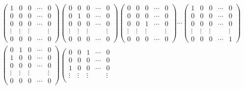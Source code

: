 \documentclass[11pt]{amsart}
\theoremstyle{definition}  %
\begin{document}
\begin{align*}
	&\left ( \begin{array}{ccccc}
		1 & 0 & 0 & \cdots & 0\\
		0 & 0 & 0 & \cdots & 0\\
		0 & 0 & 0 & \cdots & 0\\
		\vdots & \vdots & \vdots && \vdots \\
		0 & 0 & 0 & \cdots & 0
	\end{array} \right )
	\left ( \begin{array}{ccccc}
		0 & 0 & 0 & \cdots & 0\\
		0 & 1 & 0 & \cdots & 0\\
		0 & 0 & 0 & \cdots & 0\\
		\vdots & \vdots & \vdots && \vdots \\
		0 & 0 & 0 & \cdots & 0
	\end{array} \right )	
	\left ( \begin{array}{ccccc}
		0 & 0 & 0 & \cdots & 0\\
		0 & 0 & 0 & \cdots & 0\\
		0 & 0 & 1 & \cdots & 0\\
		\vdots & \vdots & \vdots && \vdots \\
		0 & 0 & 0 & \cdots & 0
	\end{array} \right )\cdots
	\left ( \begin{array}{ccccc}
		1 & 0 & 0 & \cdots & 0\\
		0 & 0 & 0 & \cdots & 0\\
		0 & 0 & 0 & \cdots & 0\\
		\vdots & \vdots & \vdots && \vdots \\
		0 & 0 & 0 & \cdots & 1
	\end{array} \right )\\
	&\left ( \begin{array}{ccccc}
		0 & 1 & 0 & \cdots & 0\\
		1 & 0 & 0 & \cdots & 0\\
		0 & 0 & 0 & \cdots & 0\\
		\vdots & \vdots & \vdots && \vdots \\
		0 & 0 & 0 & \cdots & 0
	\end{array} \right )
	\left ( \begin{array}{ccccc}
		0 & 0 & 1 & \cdots & 0\\
		0 & 0 & 0 & \cdots & 0\\
		1 & 0 & 0 & \cdots & 0\\
		\vdots & \vdots & \vdots && \vdots \\

\end{array}
\end{align*}
\end{document}
